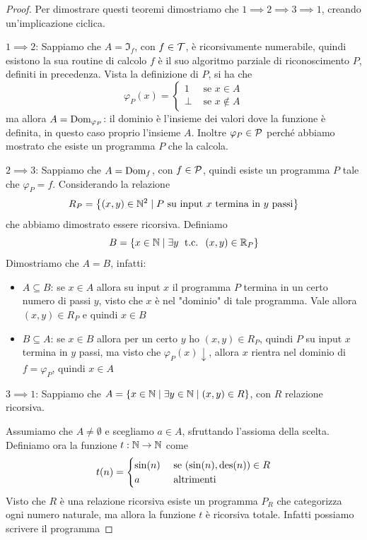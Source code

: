 \begin{proof}
	Per dimostrare questi teoremi dimostriamo che $1 \implies 2 \implies 3 \implies 1$, creando un'implicazione ciclica.

	$1 \implies 2$: Sappiamo che $A = \Im_f$, con $f \in \mathcal{T}$, è ricorsivamente numerabile, quindi esistono la sua routine di calcolo $f$ è il suo algoritmo parziale di riconoscimento $P$, definiti in precedenza. Vista la definizione di $P$, si ha che
	$$
	\varphi_P (x) = \begin{cases}
		1 & \text{ se } x \in A \\
		\bot & \text{ se } x \notin A
	\end{cases}
	$$
	ma allora $A = \text{Dom}_{\varphi_P}$: il dominio è l'insieme dei valori dove la funzione è definita, in questo caso proprio l'insieme $A$. Inoltre $\varphi_P \in \mathcal{P}$ perché abbiamo mostrato che esiste un programma $P$ che la calcola.

	$2 \implies 3$: Sappiamo che $A = \text{Dom}_f$, con $f \in \mathcal{P}$, quindi esiste un programma $P$ tale che $\varphi_P = f$. Considerando la relazione
	$$ R_P = \left\{(x,y) \in \mathbb{N}^2 \mid P \text{ su input } x \text{ termina in } y \text{ passi}\right\}$$
	che abbiamo dimostrato essere ricorsiva. Definiamo
	$$ B = \left\{x \in \mathbb{N} \mid \exists y \; \text{ t.c. } \; (x,y) \in \mathbb{R}_P \right\} $$
	Dimostriamo che $A=B$, infatti:
	\begin{itemize}
		\item $A \subseteq B$: se $x \in A$ allora su input $x$ il programma $P$ termina in un certo numero di passi $y$, visto che $x$ è nel "dominio" di tale programma. Vale allora $(x,y) \in R_P$ e quindi $x \in B$
		\item $B \subseteq A$: se $x \in B$ allora per un certo $y$ ho $(x,y) \in R_P$, quindi $P$ su input $x$ termina in $y$ passi, ma visto che $\varphi_P (x) \downarrow$, allora $x$ rientra nel dominio di $f = \varphi_P$, quindi $x \in A$
	\end{itemize}

	$3 \implies 1$: Sappiamo che $A = \left\{x \in \mathbb{N} \mid \exists y \in \mathbb{N} \mid (x,y) \in R \right\}$, con $R$ relazione ricorsiva.

	Assumiamo che $A \neq \emptyset$ e scegliamo $a \in A$, sfruttando l'assioma della scelta. Definiamo ora la funzione $t: \mathbb{N} \rightarrow \mathbb{N}$ come
	$$
	t(n) = \begin{cases}
		\sin (n) & \text{ se } (\sin(n), \operatorname{des}(n)) \in R \\
		a & \text{ altrimenti}
	\end{cases}
	$$
	Visto che $R$ è una relazione ricorsiva esiste un programma $P_R$ che categorizza ogni numero naturale, ma allora la funzione $t$ è ricorsiva totale. Infatti possiamo scrivere il programma


\end{proof}
